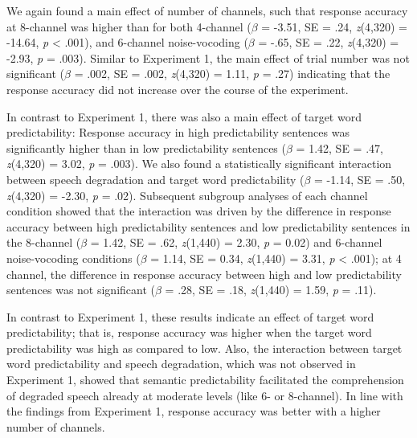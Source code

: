 \documentclass[a4paper, nobind]{templates/ociamthesis}
\begin{document}
We again found a main effect of number of channels, such that response accuracy at 8-channel was higher than for both 4-channel
(\(\beta\) = -3.51, SE = .24, \emph{z}(4,320) = -14.64, \emph{p} \textless{} .001),
and 6-channel noise-vocoding (\(\beta\) = -.65, SE = .22, \emph{z}(4,320) = -2.93, \emph{p} = .003).
Similar to Experiment 1, the main effect of trial number was not significant
(\(\beta\) = .002, SE = .002, \emph{z}(4,320) = 1.11, \emph{p} = .27) indicating that the response accuracy did not increase over the course of the experiment.

In contrast to Experiment 1, there was also a main effect of target word predictability: Response accuracy in high predictability sentences was significantly higher than in low predictability sentences
(\(\beta\) = 1.42, SE = .47, \emph{z}(4,320) = 3.02, \emph{p} = .003).
We also found a statistically significant interaction between speech degradation and target word predictability
(\(\beta\) = -1.14, SE = .50, \emph{z}(4,320) = -2.30, \emph{p} = .02).
Subsequent subgroup analyses of each channel condition showed that the interaction was driven by the difference in response accuracy between high predictability sentences and low predictability sentences
in the 8-channel (\(\beta\) = 1.42, SE = .62, \emph{z}(1,440) = 2.30, \emph{p} = 0.02)
and 6-channel noise-vocoding conditions (\(\beta\) = 1.14, SE = 0.34, \emph{z}(1,440) = 3.31, \emph{p} \textless{} .001);
at 4 channel, the difference in response accuracy between high and low predictability sentences was not significant
(\(\beta\) = .28, SE = .18, \emph{z}(1,440) = 1.59, \emph{p} = .11).

In contrast to Experiment 1, these results indicate an effect of target word predictability;
that is, response accuracy was higher when the target word predictability was high as compared to low.
Also, the interaction between target word predictability and speech degradation, which was not observed in Experiment 1,
showed that semantic predictability facilitated the comprehension of degraded speech already at moderate levels (like 6- or 8-channel).
In line with the findings from Experiment 1, response accuracy was better with a higher number of channels.
\end{document}
